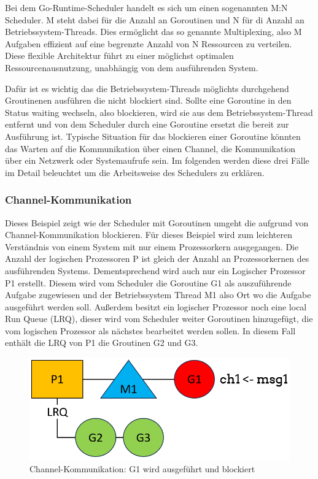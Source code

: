 \documentclass[fontsize=12pt,paper=a4,twoside=semi,parskip=half-,headsepline,headinclude]{scrreprt}
\begin{document}
Bei dem Go-Runtime-Scheduler handelt es sich um einen sogenannten M:N Scheduler. M steht dabei für die Anzahl an Goroutinen und N für di Anzahl an Betriebssystem-Threads. Dies ermöglicht das so genannte Multiplexing, also M Aufgaben effizient auf eine begrenzte Anzahl von N Ressourcen zu verteilen. Diese flexible Architektur führt zu einer möglichst optimalen Ressourcenausnutzung, unabhängig von dem ausführenden System.

Dafür ist es wichtig das die Betriebssystem-Threads möglichts durchgehend Groutinenen ausführen die nicht blockiert sind. Sollte eine Goroutine in den Status waiting wechseln, also blockieren, wird sie aus dem Betriebssystem-Thread entfernt und von dem Scheduler durch eine Goroutine ersetzt die bereit zur Ausführung ist. Typische Situation für das blockieren einer Goroutine könnten das Warten auf die Kommunikation über einen Channel, die Kommunikation über ein Netzwerk oder Systemaufrufe sein. Im folgenden werden diese drei Fälle im Detail beleuchtet um die Arbeitsweise des Schedulers zu erklären.

\subsubsection{Channel-Kommunikation}

Dieses Beispiel zeigt wie der Scheduler mit Goroutinen umgeht die aufgrund von Channel-Kommunikation blockieren. Für dieses Beispiel wird zum leichteren Verständnis von einem System mit nur einem Prozessorkern ausgegangen. Die Anzahl der logischen Prozessoren P ist gleich der Anzahl an Prozessorkernen des ausführenden Systems.  Dementsprechend wird auch nur ein Logischer Prozessor P1 erstellt. Diesem wird vom Scheduler die Goroutine G1 als auszuführende Aufgabe zugewiesen und der Betriebssystem Thread M1 also Ort wo die Aufgabe ausgeführt werden soll. Außerdem besitzt ein logischer Prozessor noch eine local Run Queue (LRQ), dieser wird vom Scheduler weiter Goroutinen hinzugefügt, die vom logischen Prozessor als nächstes bearbeitet werden sollen. In diesem Fall enthält die LRQ von P1 die Groutinen G2 und G3.

\begin{figure}[h]
	\centering
	\includegraphics[scale=0.5]{figures/GoroutineChannel1.png}
	\caption{Channel-Kommunikation: G1 wird ausgeführt und blockiert}
	\label{fig:GoroutineChannel1}
\end{figure}
\end{document}
